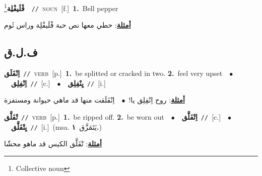 \documentclass[10pt,a4paper,twoside]{article} %
\begin{document}
\begin{multicols}{2}
{\setlength\topsep{0pt}\textbf{\foreignlanguage{arabic}{فْلَيفْلِة}}\footnote{Collective noun}\ \ {\color{gray}\texttt{//}\color{black}}\ \textsc{noun}\ [f.]\ \textbf{1.}~Bell pepper\  \begin{flushright}\color{gray}\foreignlanguage{arabic}{\textbf{\underline{\foreignlanguage{arabic}{أمثلة}}}: حطي معها نص حبة فْلَيفْلِة وراس ثَوم}\end{flushright}\color{black}} \vspace{2mm}

\vspace{-3mm}
\subsection*{\color{blue}\foreignlanguage{arabic}{ف.ل.ق}\color{blue}{}} 

{\setlength\topsep{0pt}\textbf{\foreignlanguage{arabic}{اِنْفَلَق}}\ {\color{gray}\texttt{//}\color{black}}\ \textsc{verb}\ [p.]\ \textbf{1.}~be splitted or cracked in two.  \textbf{2.}~feel very upset\ \ $\bullet$\ \ \setlength\topsep{0pt}\textbf{\foreignlanguage{arabic}{اِنْفِلِق}}\ {\color{gray}\texttt{//}\color{black}}\ [c.]\ \ $\bullet$\ \ \setlength\topsep{0pt}\textbf{\foreignlanguage{arabic}{يِنْفِلِق}}\ {\color{gray}\texttt{//}\color{black}}\ [i.]\  \begin{flushright}\color{gray}\foreignlanguage{arabic}{\textbf{\underline{\foreignlanguage{arabic}{أمثلة}}}: روح اِنْفِلِق يا!\ $\bullet$\ \  اِنْفَلَقت منها قد ماهي حيوانة ومستفزة}\end{flushright}\color{black}} \vspace{2mm}

{\setlength\topsep{0pt}\textbf{\foreignlanguage{arabic}{تْفَلَّق}}\ {\color{gray}\texttt{//}\color{black}}\ \textsc{verb}\ [p.]\ \textbf{1.}~be ripped off.  \textbf{2.}~be worn out\ \ $\bullet$\ \ \setlength\topsep{0pt}\textbf{\foreignlanguage{arabic}{اِتْفَلَّق}}\ {\color{gray}\texttt{//}\color{black}}\ [c.]\ \ $\bullet$\ \ \setlength\topsep{0pt}\textbf{\foreignlanguage{arabic}{يِتْفَلَّق}}\ {\color{gray}\texttt{//}\color{black}}\ [i.]\ \color{gray}(msa. \foreignlanguage{arabic}{يَتَمَزَّق}~\foreignlanguage{arabic}{\textbf{١.}})\color{black}\  \begin{flushright}\color{gray}\foreignlanguage{arabic}{\textbf{\underline{\foreignlanguage{arabic}{أمثلة}}}: تْفَلَّق الكيس قد ماهو محشّا}\end{flushright}\color{black}} \vspace{2mm}


\end{multicols}
\end{document}
